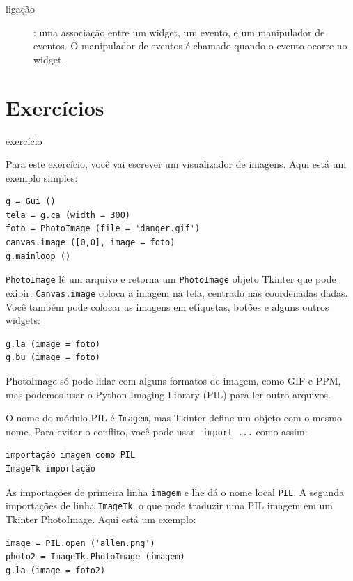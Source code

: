 \documentclass[10pt]{book}
\begin{document}
\begin{v erbatim}
\begin{description}
\item[ligação]: uma associação entre um widget, um evento, e
um manipulador de eventos. O manipulador de eventos é chamado quando o evento
ocorre no widget.

\end{description}


\section{Exercícios}

\begin{} exercício

Para este exercício, você vai escrever um visualizador de imagens. Aqui está
um exemplo simples:

\begin{verbatim}
g = Gui ()
tela = g.ca (width = 300)
foto = PhotoImage (file = 'danger.gif')
canvas.image ([0,0], image = foto)
g.mainloop ()
\end{verbatim}
%
{\tt PhotoImage} lê um arquivo e retorna um {\tt PhotoImage} objeto
Tkinter que pode exibir. {\tt Canvas.image} coloca a imagem na
tela, centrado nas coordenadas dadas. Você também pode colocar as imagens em
etiquetas, botões e alguns outros widgets:

\begin{verbatim}
g.la (image = foto)
g.bu (image = foto)
\end{verbatim}
%
PhotoImage só pode lidar com alguns formatos de imagem, como GIF e PPM, 
mas podemos usar o Python Imaging Library (PIL) para ler outro
arquivos.

O nome do módulo PIL é {\tt Imagem}, mas Tkinter define um
objeto com o mesmo nome. Para evitar o conflito, você pode usar {\tt
  import ...} como assim:

\begin{verbatim}
importação imagem como PIL
ImageTk importação
\end{verbatim}
%
As importações de primeira linha {\tt imagem} e
lhe dá o nome local {\tt PIL}. A segunda
importações de linha {\tt ImageTk}, o que pode traduzir uma PIL
imagem em um Tkinter PhotoImage. Aqui está um exemplo:

\begin{verbatim}
image = PIL.open ('allen.png')
photo2 = ImageTk.PhotoImage (imagem)
g.la (image = foto2)
\end{verbatim}
%


\end{}
\end{v erbatim}
\end{document}

